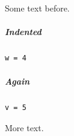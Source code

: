 \documentclass[12pt]{article}
\begin{document}
Some text before.

\subparagraph{Indented}

\begin{lstlisting}[frame=tb,breaklines=true]
w = 4
\end{lstlisting}

\subparagraph{Again}

\begin{lstlisting}[frame=tb]
v = 5
\end{lstlisting}
More text.
\end{document}
